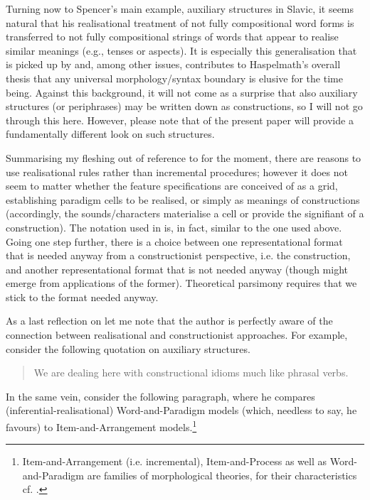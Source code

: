 \documentclass[output=paper]{langsci/langscibook}
\begin{document}
\begin{sloppypar}
Turning now to Spencer’s main example, auxiliary structures in Slavic, it seems natural that his realisational treatment of not fully compositional word forms is transferred to not fully compositional strings of words that appear to realise similar meanings (e.g., tenses or aspects). It is especially this generalisation that is picked up by \citet[59]{Haspelmath2011} and, among other issues, contributes to Haspelmath’s overall thesis that any universal morphology/syntax boundary is elusive for the time being. Against this background, it will not come as a surprise that also auxiliary structures (or periphrases) may be written down as constructions, so I will not go through this here. However, please note that  of the present paper will provide a fundamentally different look on such structures.

Summarising my fleshing out of  reference to \citet{Spencer2001} for the moment, there are reasons to use realisational rules rather than incremental procedures; however it does not seem to matter whether the feature specifications are conceived of as a grid, establishing paradigm cells to be realised, or simply as meanings of constructions (accordingly, the sounds/characters materialise a cell or provide the signifiant of a construction). The notation used in \citet{Spencer2001} is, in fact, similar to the one used above. Going one step further, there is a choice between one representational format that is needed anyway from a constructionist perspective, i.e. the construction, and another representational format that is not needed anyway (though might emerge from applications of the former). Theoretical parsimony requires that we stick to the format needed anyway.
\end{sloppypar}

As a last reflection on \citet{Spencer2001} let me note that the author is perfectly aware of the connection between realisational and constructionist approaches. For example, consider the following quotation on auxiliary structures.

\begin{quote}
We are dealing here with constructional idioms much like phrasal verbs. \citep[283]{Spencer2001}
\end{quote}

In the same vein, consider the following paragraph, where he compares (in\-fer\-en\-tial-realisational) Word-and-Paradigm models (which, needless to say, he favours) to Item-and-Arrangement models.\footnote{Item-and-Arrangement (i.e. incremental), Item-and-Process as well as Word-and-Paradigm are families of morphological theories, for their characteristics cf. \citet{Stewart2016}.}
\end{document}

